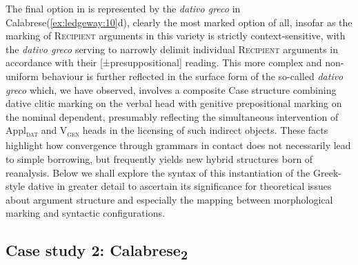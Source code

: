 \documentclass[output=paper,modfonts,nonflat]{langsci/langscibook}
\begin{document}
The final option in  is represented by the \textit{dativo greco} in Calabrese(\ref{ex:ledgeway:10}d), clearly the most marked option of all, insofar as the marking of \textsc{Recipient} arguments in this variety is strictly context-sensitive, with the \textit{dativo greco} serving to narrowly delimit individual \textsc{Recipient} arguments in accordance with their [±presuppositional] reading. This more complex and non-uniform behaviour is further reflected in the surface form of the so-called \textit{dativo greco} which, we have observed, involves a composite Case structure combining dative clitic marking on the verbal head with genitive prepositional marking on the nominal dependent, presumably reflecting the simultaneous intervention of Appl\textsc{\textsubscript{dat}} and V\textsc{\textsubscript{gen}} heads in the licensing of such indirect objects. These facts highlight how convergence through grammars in contact does not necessarily lead to simple borrowing, but frequently yields new hybrid structures born of reanalysis. Below we shall explore the syntax of this instantiation of the Greek-style dative in greater detail to ascertain its significance for theoretical issues about argument structure and especially the mapping between morphological marking and syntactic configurations.
 

 
\subsection{Case study 2: Calabrese\textsubscript{2}}
\end{document}
